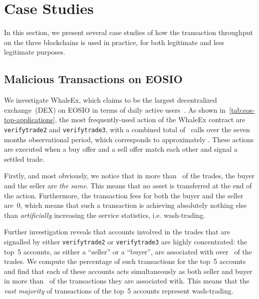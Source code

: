 \section{Case Studies}
\label{sec:4:case-studies}

In this section, we present several case studies of how the transaction throughput on the three blockchains is used in practice,  for both legitimate and less legitimate purposes.

\subsection{Malicious Transactions on EOSIO}
\label{sec:eoscase}
We investigate WhaleEx, which claims to be the largest decentralized exchange~(DEX) on EOSIO in terms of daily active users~\cite{WhaleEx2020}.
As shown in~\autoref{tab:eos-top-applications}, the most frequently-used action of the WhaleEx contract are \texttt{verifytrade2} and \texttt{verifytrade3}, with a combined total of~ calls over the seven months observational period, which corresponds to approximately . These actions are executed when a buy offer and a sell offer match each other and signal a settled trade.



Firstly, and most obviously, we notice that in more than~ of the trades, the buyer and the seller are \emph{the same}.
This means that no asset is transferred at the end of the action.
Furthermore, the transaction fees for both the buyer and the seller are~0, which means that such a transaction is achieving absolutely nothing else than \emph{artificially} increasing the service statistics, i.e. wash-trading.

Further investigation reveals that accounts involved in the trades that are signalled by either \texttt{verifytrade2} or \texttt{verifytrade3} are highly concentrated: the top~5 accounts, as either a ``seller'' or a ``buyer'', are associated with over~ of the trades.
We compute the percentage of such transactions for the top~5 accounts and find that each of these accounts acts simultaneously as both seller and buyer in more than~ of the transactions they are associated with.
This means that the \emph{vast majority} of transactions of the top~5 accounts represent wash-trading.


